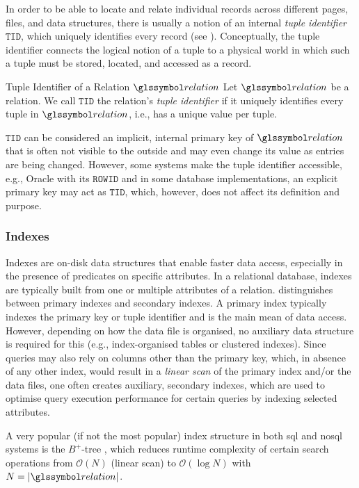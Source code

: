 In order to be able to locate and relate individual records across different pages, files, and data structures, there is usually a notion of an internal \emph{tuple identifier} $\mathtt{TID}$, which uniquely identifies every record (see ). Conceptually, the tuple identifier connects the logical notion of a tuple to a physical world in which such a tuple must be stored, located, and accessed as a record.

\begin{definition}[label=definition:tuple_identifier]{Tuple Identifier of a Relation $\relation$}{}
    Let $\relation$ be a relation. We call $\mathtt{TID}$ the relation's \emph{tuple identifier} if it uniquely identifies every tuple in $\relation$, i.e., has a unique value per tuple.
\end{definition}

$\mathtt{TID}$ can be considered an implicit, internal primary key of $\relation$ that is often not visible to the outside and may even change its value as entries are being changed. However, some systems make the tuple identifier accessible, e.g., Oracle with its $\mathtt{ROWID}$ and in some database implementations, an explicit primary key may act as $\mathtt{TID}$, which, however, does not affect its definition and purpose.

\subsubsection{Indexes}
\label{section:indexes}
Indexes are on-disk data structures that enable faster data access, especially in the presence of predicates on specific attributes. In a relational database, indexes are typically built from one or multiple attributes of a relation. \cite{Petrov:2019Database} distinguishes between primary indexes and secondary indexes. A primary index typically indexes the primary key or tuple identifier and is the main mean of data access. However, depending on how the data file is organised, no auxiliary data structure is required for this (e.g., index-organised tables or clustered indexes). Since queries may also rely on columns other than the primary key, which, in absence of any other index, would result in a \emph{linear scan} of the primary index and/or the data files, one often creates auxiliary, secondary indexes, which are used to optimise query execution performance for certain queries by indexing selected attributes. 

A very popular (if not the most popular) index structure in both \acrshort{sql} and \acrshort{nosql} systems is the $B^{+}$-tree \cite{Bayer:2002Organization}, which reduces runtime complexity of certain search operations from $\mathcal{O}(N)$ (linear scan) to $\mathcal{O}(\log N)$ with $N = |\relation|$. 

